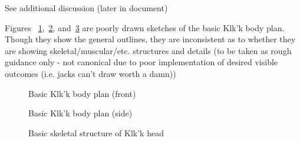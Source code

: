 See additional discussion (later in document)

Figures ~\ref{fig:Klk'k-body-front},~\ref{fig:Klk'k-body-side}, and~\ref{fig:Klk'k-body-head} are poorly drawn sketches of the basic Klk'k body plan. Though
they show the general outlines, they are inconsistent as to whether
they are showing skeletal/muscular/etc. structures and details (to be
taken as rough guidance only - not canonical due to poor
implementation of desired visible outcomes (i.e. jacks can't draw
worth a damn))

\begin{figure}
\begin{center}
    \caption{Basic Klk'k body plan (front)}
    \label{fig:Klk'k-body-front}
\end{center}
\end{figure}
\begin{figure}
\begin{center}
    \caption{Basic Klk'k body plan (side)}
    \label{fig:Klk'k-body-side}
\end{center}
\end{figure}
\begin{figure}
\begin{center}
    \caption{Basic skeletal structure of Klk'k head}
    \label{fig:Klk'k-body-head}
\end{center}
\end{figure}

